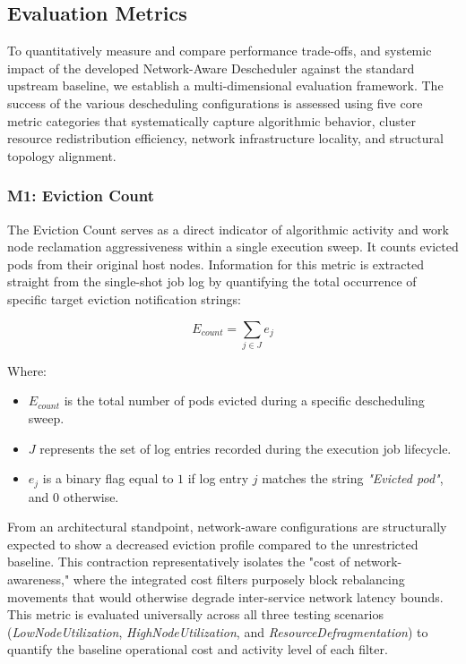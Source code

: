 \subsection{Evaluation Metrics}
\label{subsec:netaware4_evaluationmetrics}
To quantitatively measure and compare performance trade-offs, and systemic impact of the developed Network-Aware Descheduler against the standard upstream baseline, we establish a multi-dimensional evaluation framework. The success of the various descheduling configurations is assessed using five core metric categories that systematically capture algorithmic behavior, cluster resource redistribution efficiency, network infrastructure locality, and structural topology alignment.

\subsubsection{M1: Eviction Count}
\label{subsubsec:netaware4_evaluationmetrics1}
The Eviction Count serves as a direct indicator of algorithmic activity and work node reclamation aggressiveness within a single execution sweep. It counts evicted pods from their original host nodes. Information for this metric is extracted straight from the single-shot job log by quantifying the total occurrence of specific target eviction notification strings:

\[
E_{count} = \sum_{j \in J} e_j
\]

Where:

\begin{itemize}
    \item \(E_{count}\) is the total number of pods evicted during a specific descheduling sweep.
    
    \item \(J\) represents the set of log entries recorded during the execution job lifecycle.
    
    \item \(e_j\) is a binary flag equal to \(1\) if log entry \(j\) matches the string \textit{"Evicted pod"}, and \(0\) otherwise.
\end{itemize}

From an architectural standpoint, network-aware configurations are structurally expected to show a decreased eviction profile compared to the unrestricted baseline. This contraction representatively isolates the "cost of network-awareness," where the integrated cost filters purposely block rebalancing movements that would otherwise degrade inter-service network latency bounds. This metric is evaluated universally across all three testing scenarios (\textit{LowNodeUtilization}, \textit{HighNodeUtilization}, and \textit{ResourceDefragmentation}) to quantify the baseline operational cost and activity level of each filter.

